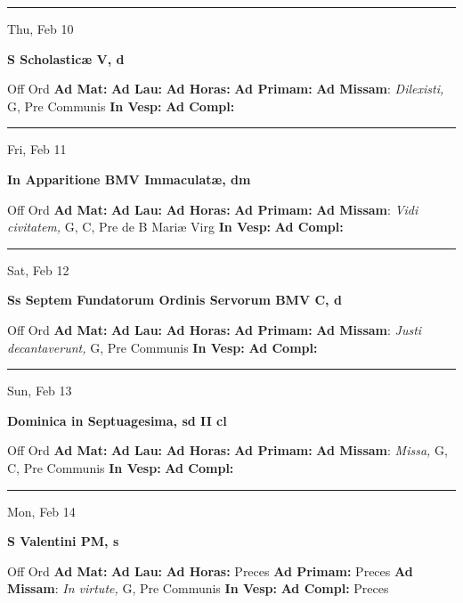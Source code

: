 \documentclass[letterpaper, 10pt]{article}
\begin{document}
\hrule
\begin{center}
Thu, Feb 10
\end{center}\textbf{ \large S Scholasticæ V, \textnormal{\normalsize d}}
\begin{justify}
Off Ord
\textbf{Ad Mat: }
\textbf{Ad Lau: }
\textbf{Ad Horas: }
\textbf{Ad Primam: }
\textbf{Ad Missam}: \textit{Dilexisti,} G, Pre Communis
\textbf{In Vesp: }
\textbf{Ad Compl: }\end{justify}



\hrule
\begin{center}
Fri, Feb 11
\end{center}\textbf{ \large In Apparitione BMV Immaculatæ, \textnormal{\normalsize dm}}
\begin{justify}
Off Ord
\textbf{Ad Mat: }
\textbf{Ad Lau: }
\textbf{Ad Horas: }
\textbf{Ad Primam: }
\textbf{Ad Missam}: \textit{Vidi civitatem,} G, C, Pre de B Mariæ Virg
\textbf{In Vesp: }
\textbf{Ad Compl: }\end{justify}



\hrule
\begin{center}
Sat, Feb 12
\end{center}\textbf{ \large Ss Septem Fundatorum Ordinis Servorum BMV C, \textnormal{\normalsize d}}
\begin{justify}
Off Ord
\textbf{Ad Mat: }
\textbf{Ad Lau: }
\textbf{Ad Horas: }
\textbf{Ad Primam: }
\textbf{Ad Missam}: \textit{Justi decantaverunt,} G, Pre Communis
\textbf{In Vesp: }
\textbf{Ad Compl: }\end{justify}



\hrule
\begin{center}
Sun, Feb 13
\end{center}\textbf{ \large Dominica in Septuagesima, \textnormal{\normalsize sd II cl}}
\begin{justify}
Off Ord
\textbf{Ad Mat: }
\textbf{Ad Lau: }
\textbf{Ad Horas: }
\textbf{Ad Primam: }
\textbf{Ad Missam}: \textit{Missa,} G, C, Pre Communis
\textbf{In Vesp: }
\textbf{Ad Compl: }\end{justify}



\hrule
\begin{center}
Mon, Feb 14
\end{center}\textbf{ \large S Valentini PM, \textnormal{\normalsize s}}
\begin{justify}
Off Ord
\textbf{Ad Mat: }
\textbf{Ad Lau: }
\textbf{Ad Horas: }Preces
\textbf{Ad Primam: }Preces
\textbf{Ad Missam}: \textit{In virtute,} G, Pre Communis
\textbf{In Vesp: }
\textbf{Ad Compl: }Preces\end{justify}
\end{document}
